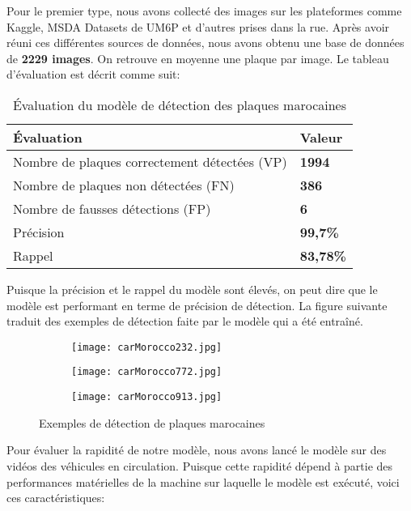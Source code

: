     
    Pour le premier type, nous avons collecté des images sur les plateformes comme Kaggle, MSDA Datasets de UM6P et d’autres prises dans la rue. Après avoir réuni ces différentes sources de données, nous avons obtenu une base de données de \textbf{2229 images}. On retrouve en moyenne une plaque par image. Le tableau d’évaluation est décrit comme suit:
    \begin{table}[H]
        \centering
        \begin{tabular}{|l|l|}
            \hline
            \rowcolor{Gray}
            \textbf{Évaluation} & \textbf{Valeur} \\ \hline
            Nombre de plaques correctement détectées (VP) & \textbf{1994} \\ \hline
            Nombre de plaques non détectées (FN) & \textbf{386} \\ \hline
            Nombre de fausses détections (FP) & \textbf{6} \\ \hline
            Précision & \textbf{99,7\%} \\ \hline
            Rappel & \textbf{83,78\%} \\ \hline
        \end{tabular}
        \caption{Évaluation du modèle de détection des plaques marocaines}
    \end{table}
    Puisque la précision et le rappel du modèle sont élevés, on peut dire que le modèle est performant en terme de précision de détection. La figure suivante traduit des exemples de détection faite par le modèle qui a été entraîné.
    \begin{figure}[H]
        \begin{subfigure}{0.3\textwidth}
            \centering
            \texttt{[image: carMorocco232.jpg]}
        \end{subfigure}
        \hfill
        \begin{subfigure}{0.3\textwidth}
            \centering
            \texttt{[image: carMorocco772.jpg]}
        \end{subfigure}
        \hfill
        \begin{subfigure}{0.3\textwidth}
            \centering
            \texttt{[image: carMorocco913.jpg]}
        \end{subfigure}
        \caption{Exemples de détection de plaques marocaines}
    \end{figure}
    Pour évaluer la rapidité de notre modèle, nous avons lancé le modèle sur des vidéos des véhicules en circulation. Puisque cette rapidité dépend à partie des performances matérielles de la machine sur laquelle le modèle est exécuté, voici ces caractéristiques:
